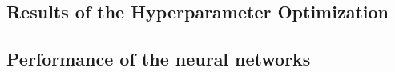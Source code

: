 \label{sec:results}

\subsection{Results of the Hyperparameter Optimization}
\label{subsec:perfmlp}



\subsection{Performance of the neural networks}
\label{subsec:perfgat}
